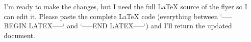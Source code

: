 I’m ready to make the changes, but I need the full LaTeX source of the flyer so I can edit it. Please paste the complete LaTeX code (everything between `-----BEGIN LATEX-----` and `-----END LATEX-----`) and I’ll return the updated document.
